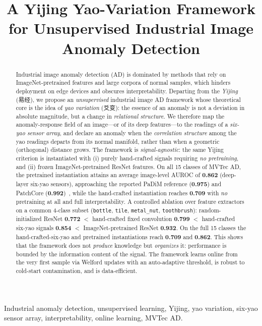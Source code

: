 \documentclass[journal,10pt]{IEEEtran}
\title{A Yijing Yao-Variation Framework for Unsupervised Industrial Image
Anomaly Detection}
\author{%
\IEEEauthorblockN{Xinglu Ma, \textit{Member, IEEE}, et al.}
\IEEEauthorblockA{School of Information Science and Technology\\
Qingdao University of Science and Technology, Qingdao, China\\
Email: \texttt{mxl@qust.edu.cn}}
}
\begin{document}
\maketitle

\begin{abstract}
Industrial image anomaly detection (AD) is dominated by methods that
rely on ImageNet-pretrained features and large corpora of normal samples,
which hinders deployment on edge devices and obscures interpretability.
Departing from the \emph{Yijing} (易经), we propose an \emph{unsupervised}
industrial image AD framework whose theoretical core is the idea of
\emph{yao variation} (爻变): the essence of an anomaly is not a deviation
in absolute magnitude, but a change in \emph{relational structure}. We
therefore map the anomaly-response field of an image---or of its deep
features---to the readings of a \emph{six-yao sensor array}, and declare an
anomaly when the \emph{correlation structure} among the yao readings
departs from its normal manifold, rather than when a geometric
(orthogonal) distance grows. The framework is \emph{signal-agnostic}: the
same Yijing criterion is instantiated with (i) purely hand-crafted signals
requiring \emph{no pretraining}, and (ii) frozen ImageNet-pretrained
ResNet features. On all 15 classes of MVTec AD, the pretrained
instantiation attains an average image-level AUROC of \textbf{0.862}
(deep-layer six-yao sensors), approaching the reported PaDiM reference
(\textbf{0.975}) and PatchCore (\textbf{0.992})~\cite{defard2021padim,roth2022patchcore},
while the hand-crafted instantiation reaches \textbf{0.709} with \emph{no}
pretraining at all and full interpretability.
A controlled ablation over feature extractors on a common 4-class subset
(\texttt{bottle}, \texttt{tile}, \texttt{metal\_nut}, \texttt{toothbrush}):
random-initialized ResNet \textbf{0.772} $<$ hand-crafted fixed convolution
\textbf{0.799} $<$ hand-crafted six-yao signals \textbf{0.854} $<$
ImageNet-pretrained ResNet \textbf{0.932}.
On the full 15 classes the hand-crafted-six-yao and pretrained
instantiations reach \textbf{0.709} and \textbf{0.862}. This shows that the framework does
not \emph{produce} knowledge but \emph{organizes} it: performance is bounded
by the information content of the signal. The framework learns online from
the very first sample via Welford updates with an auto-adaptive threshold,
is robust to cold-start contamination, and is data-efficient.
\end{abstract}

\begin{IEEEkeywords}
Industrial anomaly detection, unsupervised learning, Yijing, yao
variation, six-yao sensor array, interpretability, online learning,
MVTec AD.
\end{IEEEkeywords}
\end{document}

